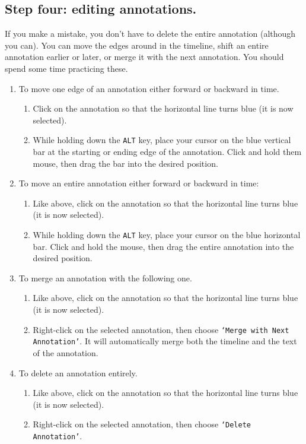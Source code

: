 \documentclass[letterpaper,12pt]{article}
\begin{document}
\subsection*{Step four: editing annotations.}
If you make a mistake, you don't have to delete the entire annotation (although you can). You can move the edges around in the timeline, shift an entire annotation earlier or later, or merge it with the next annotation. You should spend some time practicing these.
\begin{enumerate}
\item To move one edge of an annotation either forward or backward in time.
\begin{enumerate}
\item Click on the annotation so that the horizontal line turns blue (it is now selected).
\item While holding down the \texttt{ALT} key, place your cursor on the blue vertical bar at the starting or ending edge of the annotation. Click and hold them mouse, then drag the bar into the desired position.
\end{enumerate}
\item To move an entire annotation either forward or backward in time:
\begin{enumerate}
\item Like above, click on the annotation so that the horizontal line turns blue (it is now selected).
\item While holding down the \texttt{ALT} key, place your cursor on the blue horizontal bar. Click and hold the mouse, then drag the entire annotation into the desired position.
\end{enumerate}
\item To merge an annotation with the following one.
\begin{enumerate}
\item Like above, click on the annotation so that the horizontal line turns blue (it is now selected).
\item Right-click on the selected annotation, then choose \texttt{`Merge with Next Annotation'}. It will automatically merge both the timeline and the text of the annotation.
\end{enumerate}
\item To delete an annotation entirely.
\begin{enumerate}
\item Like above, click on the annotation so that the horizontal line turns blue (it is now selected).
\item Right-click on the selected annotation, then choose \texttt{`Delete Annotation'}.
\end{enumerate}
\end{enumerate}
\end{document}
